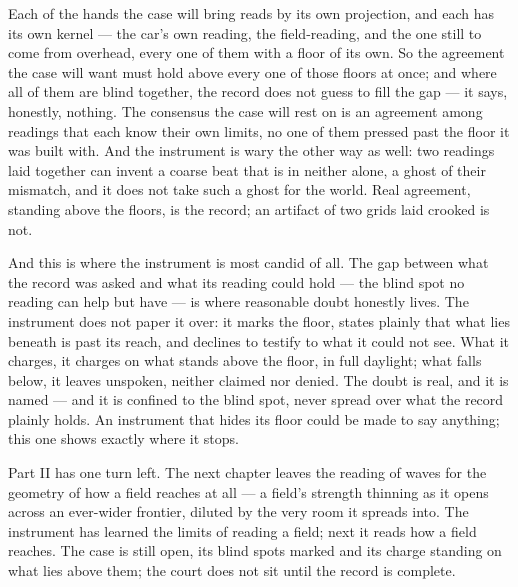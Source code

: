 Each of the hands the case will bring reads by its own projection, and each has its own kernel --- the car's own
reading, the field-reading, and the one still to come from overhead, every one of them with a floor of its own.
So the agreement the case will want must hold above every one of those floors at once; and where all of them are
blind together, the record does not guess to fill the gap --- it says, honestly, nothing. The consensus the case
will rest on is an agreement among readings that each know their own limits, no one of them pressed past the
floor it was built with. And the instrument is wary the other way as well: two readings laid together can
invent a coarse beat that is in neither alone, a ghost of their mismatch, and it does not take such a ghost for
the world. Real agreement, standing above the floors, is the record; an artifact of two grids laid crooked is
not.

And this is where the instrument is most candid of all. The gap between what the record was asked and what its
reading could hold --- the blind spot no reading can help but have --- is where reasonable doubt honestly lives.
The instrument does not paper it over: it marks the floor, states plainly that what lies beneath is past its
reach, and declines to testify to what it could not see. What it charges, it charges on what stands above the
floor, in full daylight; what falls below, it leaves unspoken, neither claimed nor denied. The doubt is real,
and it is named --- and it is confined to the blind spot, never spread over what the record plainly holds. An
instrument that hides its floor could be made to say anything; this one shows exactly where it stops.

Part II has one turn left. The next chapter leaves the reading of waves for the geometry of how a field reaches
at all --- a field's strength thinning as it opens across an ever-wider frontier, diluted by the very room it
spreads into. The instrument has learned the limits of reading a field; next it reads how a field reaches. The
case is still open, its blind spots marked and its charge standing on what lies above them; the court does not
sit until the record is complete.


